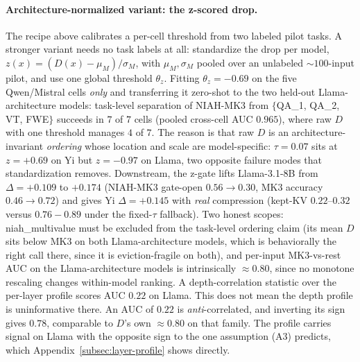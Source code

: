 \paragraph{Architecture-normalized variant: the z-scored drop.} The recipe
above calibrates a per-cell threshold from two labeled pilot tasks. A
stronger variant needs no task labels at all: standardize the drop
per model, $z(x) = (D(x) - \mu_M) / \sigma_M$, with $\mu_M, \sigma_M$
pooled over an unlabeled $\sim 100$-input pilot, and use one global
threshold $\theta_z$. Fitting $\theta_z = -0.69$ on the five Qwen/Mistral
cells \emph{only} and transferring it zero-shot to the two held-out
Llama-architecture models: task-level separation of NIAH-MK3 from
$\{$QA\_1, QA\_2, VT, FWE$\}$ succeeds in $7$ of $7$ cells (pooled
cross-cell AUC $0.965$), where raw $D$ with one threshold manages $4$ of
$7$. The reason is that raw $D$ is an architecture-invariant
\emph{ordering} whose location and scale are model-specific: $\tau = 0.07$
sits at $z = +0.69$ on Yi but $z = -0.97$ on Llama, two opposite failure
modes that standardization removes. Downstream, the z-gate lifts
Llama-3.1-8B from $\Delta = +0.109$ to $\boldsymbol{+0.174}$ (NIAH-MK3
gate-open $0.56 \to 0.30$, MK3 accuracy $0.46 \to 0.72$) and gives Yi
$\Delta = +0.145$ with \emph{real} compression (kept-KV $0.22$--$0.32$
versus $0.76-0.89$ under the fixed-$\tau$ fallback). Two honest
scopes: niah\_multivalue must be excluded from the task-level ordering
claim (its mean $D$ sits below MK3 on both Llama-architecture models, which
is behaviorally the right call there, since it is eviction-fragile on
both), and per-input MK3-vs-rest AUC on the Llama-architecture models is
intrinsically $\approx 0.80$, since no monotone rescaling changes
within-model ranking. A depth-correlation statistic over the per-layer profile scores AUC
$0.22$ on Llama. This does not mean the depth profile is uninformative there.
An AUC of $0.22$ is \emph{anti}-correlated, and inverting its sign gives
$0.78$, comparable to $D$'s own $\approx 0.80$ on that family. The profile
carries signal on Llama with the opposite sign to the one assumption (A3)
predicts, which Appendix~\ref{subsec:layer-profile} shows directly.

